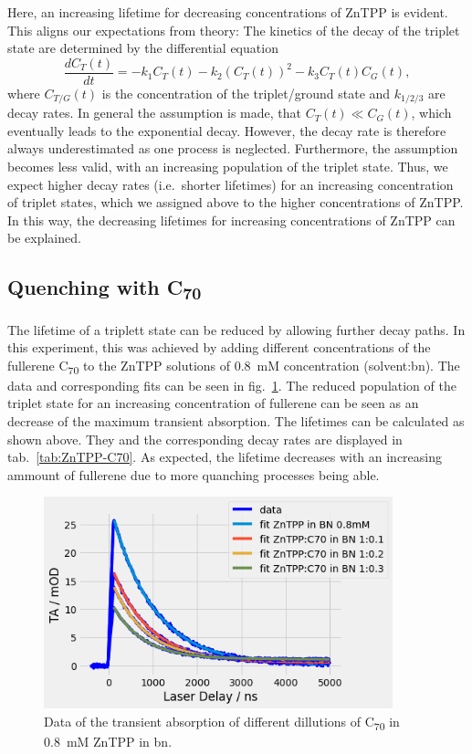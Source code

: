 Here, an increasing lifetime for decreasing concentrations of ZnTPP is evident. This aligns our expectations from theory: The kinetics of the decay of the triplet state are determined by the differential equation 
\begin{equation}
    \frac{dC_T(t)}{dt} = - k_1C_T(t) - k_2(C_T(t))^2 - k_3 C_T(t)C_G(t),
\end{equation}
where $C_{T/G}(t)$ is the concentration of the triplet/ground state and $k_{1/2/3}$ are decay rates. In general the assumption is made, that $C_T(t) \ll C_G(t)$, which eventually leads to the exponential decay. However, the decay rate is therefore always underestimated as one process is neglected. Furthermore, the assumption becomes less valid, with an increasing population of the triplet state. Thus, we expect higher decay rates (i.e.~shorter lifetimes) for an increasing concentration of triplet states, which we assigned above to the higher concentrations of ZnTPP. In this way, the decreasing lifetimes for increasing concentrations of ZnTPP can be explained.

\subsection*{Quenching with C\textsubscript{70}}
The lifetime of a triplett state can be reduced by allowing further decay paths. In this experiment, this was achieved by adding different concentrations of the fullerene C\textsubscript{70} to the ZnTPP solutions of \SI{0.8}{\milli\nauticalmile} concentration (solvent:bn). The data and corresponding fits can be seen in fig.~\ref{fig:ZnTPP-C70}. The reduced population of the triplet state for an increasing concentration of fullerene can be seen as an decrease of the maximum transient absorption. The lifetimes can be calculated as shown above. They and the corresponding decay rates are displayed in tab.~\ref{tab:ZnTPP-C70}. As expected, the lifetime decreases with an increasing ammount of fullerene due to more quanching processes being able. 

\begin{figure}[h]
    \centering
    \includegraphics[width = 0.9\textwidth]{Bilder/Auswertung/TRAS/ZnTPP-C70.png}
    \caption{Data of the transient absorption of different dillutions of C\textsubscript{70} in \SI{0.8}{\milli\nauticalmile} ZnTPP in bn.}
    \label{fig:ZnTPP-C70}
\end{figure}

